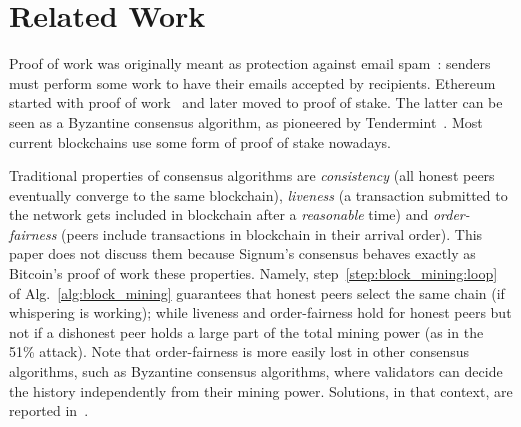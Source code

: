 \section{Related Work}\label{sec:related_work}

Proof of work was originally meant as protection against email spam~\cite{DworkN92}:
senders must perform some work to have their emails accepted by recipients.
Ethereum started with proof of work~\cite{AntonopoulosW18} and later
moved to proof of stake. The latter can be seen as a
Byzantine consensus algorithm, as pioneered by Tendermint~\cite{Kwon14}.
Most current blockchains use some form of proof of stake nowadays.

Traditional properties of consensus algorithms are \emph{consistency}
(all honest peers eventually converge to the same blockchain), \emph{liveness}
(a transaction submitted to the network gets included in blockchain after
a \emph{reasonable} time) and \emph{order-fairness} (peers include transactions
in blockchain in their arrival order). This paper does not discuss them because Signum's consensus
behaves exactly as Bitcoin's proof of work \wrt these properties.
Namely, step~\ref{step:block_mining:loop} of Alg.~\ref{alg:block_mining}
guarantees that honest peers select the same chain (if whispering is working);
while liveness and order-fairness hold for honest peers but not
if a dishonest peer holds a large part of the total mining power
(as in the 51\% attack).
Note that order-fairness is more easily lost in other consensus algorithms, such
as Byzantine consensus algorithms, where validators can decide the history
independently from their mining power. Solutions, in that context, are reported
in~\cite{KelkarZGJ20}.

